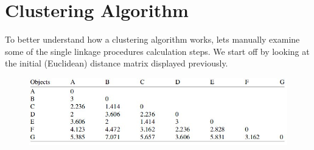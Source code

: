 \documentclass[a4paper,12pt]{article}
\begin{document}
\section{Clustering Algorithm}
To better understand how a clustering algorithm works, lets manually examine
some of the single linkage procedures calculation steps. We start off by looking at
the initial (Euclidean) distance matrix displayed previously.

\begin{figure}[h!]
	\begin{center}
		\includegraphics[scale=0.6]{images/DistanceMatrix.jpg}\\
	\end{center}
\end{figure}
\end{document}
